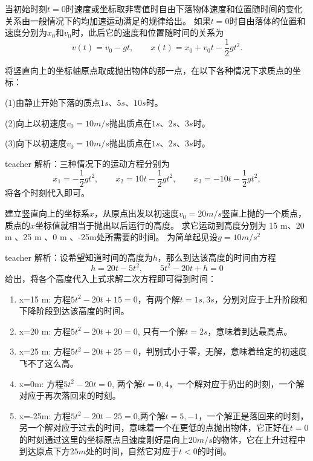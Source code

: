 当初始时刻$t=0$时速度或坐标取非零值时自由下落物体速度和位置随时间的变化关系由一般情况下的均加速运动满足的规律给出。
如果$t=0$时自由落体的位置和速度分别为$x_0$和$v_0$时，此后它的速度和位置随时间的关系为
\begin{equation}
v(t) = v_0-gt,\qquad x(t) = x_0+v_0t-\frac{1}{2}gt^2.
\end{equation}

\begin{example}
将竖直向上的坐标轴原点取成抛出物体的那一点，在以下各种情况下求质点的坐标：

(1)由静止开始下落的质点$1\unit{s}$、$5\unit{s}$、$10\unit{s}$时。

(2)向上以初速度$v_0=10\unit{m/s}$抛出质点在$1\unit{s}$、$2\unit{s}$、$3\unit{s}$时。

(3)向下以初速度$v_0=10\unit{m/s}$抛出质点在$1\unit{s}$、$2\unit{s}$、$3\unit{s}$时。
\begin{taggedblock}{teacher}
\newline
解析：三种情况下的运动方程分别为
\[
x_1 = -\frac{1}{2}gt^2,\qquad x_2 = 10t-\frac{1}{2}gt^2,\qquad x_3 = -10t-\frac{1}{2}gt^2,
\]
将各个时刻代入即可。
\end{taggedblock}
\end{example}

\begin{example}
建立竖直向上的坐标系$x$，从原点出发以初速度$v_0 = 20\unit{m/s}$竖直上抛的一个质点，质点的$x$坐标值就相当于抛出以后运行的高度。
求它运动到高度分别为 15 m、20 m 、25 m 、0 m 、-25m处所需要的时间。
为简单起见设$g=10 \unit{m/s^2}$
\begin{taggedblock}{teacher}
\newline
解析：设希望知道时间的高度为$h$，那么到达该高度的时间由方程
\[
h = 20t-5t^2,\qquad  5t^2-20t+h = 0
\]
给出，将各个高度代入上式求解二次方程即可得到时间：
\begin{enumerate}
\item x=15 m: 方程$5t^2-20t+15=0$，有两个解$t=1s,3s$，分别对应于上升阶段和下降阶段到达该高度的时间。
\item x=20 m: 方程$5t^2-20t+20=0$, 只有一个解$t=2s$，意味着到达最高点。

\item  x=25 m: 方程$5t^2-20t+25=0$，判别式小于零，无解，意味着给定的初速度飞不了这么高。

\item x=0m: 方程$5t^2-20t=0$, 两个解$t=0,4$，一个解对应于扔出的时刻，一个解对应于再次落回来的时刻。

\item x=-25m: 方程$5t^2-20t-25=0$,两个解$t=5,-1$，一个解正是落回来的时刻，另一个解对应于过去的时间，意味着一个在更低的点抛出物体，它正好在$t=0$的时刻通过这里的坐标原点且速度刚好是向上$20\unit{m/s}$的物体，它在上升过程中到达原点下方$25\unit{m}$处的时间，自然它对应于$t<0$的时间。
\end{enumerate}
\end{taggedblock}
\end{example}

